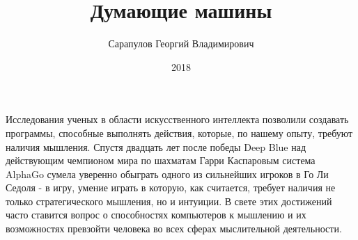 \documentclass[12pt, specialist, subf, substylefile = spbu.rtx]{disser}
\begin{document}

\title{Думающие машины}


\author{Сарапулов Георгий Владимирович}


\date{2018}

\maketitle


\tableofcontents

\intro
Исследования ученых в области искусственного интеллекта позволили создавать программы, способные выполнять действия, которые, по нашему опыту, требуют наличия мышления. Спустя двадцать лет после победы Deep Blue над действующим чемпионом мира по шахматам Гарри Каспаровым система AlphaGo сумела уверенно обыграть одного из сильнейших игроков в Го Ли Седоля - в игру, умение играть в которую, как считается, требует наличия не только стратегического мышления, но и интуиции. В свете этих достижений часто ставится вопрос о способностях компьютеров к мышлению и их возможностях превзойти человека во всех сферах мыслительной деятельности.
\end{document}

